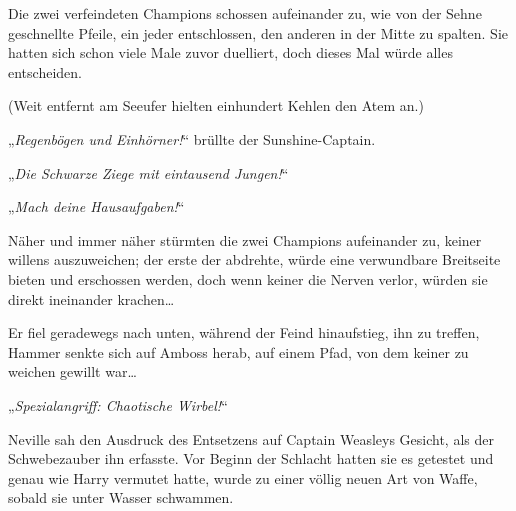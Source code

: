 Die zwei verfeindeten Champions schossen aufeinander zu, wie von der Sehne geschnellte Pfeile, ein jeder entschlossen, den anderen in der Mitte zu spalten. Sie hatten sich schon viele Male zuvor duelliert, doch dieses Mal würde alles entscheiden.

(Weit entfernt am Seeufer hielten einhundert Kehlen den Atem an.)

„\emph{Regenbögen und Einhörner!}“ brüllte der Sunshine-Captain.

„\emph{Die Schwarze Ziege mit eintausend Jungen!}“

„\emph{Mach deine Hausaufgaben!}“

Näher und immer näher stürmten die zwei Champions aufeinander zu, keiner willens auszuweichen; der erste der abdrehte, würde eine verwundbare Breitseite bieten und erschossen werden, doch wenn keiner die Nerven verlor, würden sie direkt ineinander krachen…

Er fiel geradewegs nach unten, während der Feind hinaufstieg, ihn zu treffen, Hammer senkte sich auf Amboss herab, auf einem Pfad, von dem keiner zu weichen gewillt war…

„\emph{Spezialangriff: Chaotische Wirbel!}“

Neville sah den Ausdruck des Entsetzens auf Captain Weasleys Gesicht, als der Schwebezauber ihn erfasste. Vor Beginn der Schlacht hatten sie es getestet und genau wie Harry vermutet hatte, wurde  zu einer völlig neuen Art von Waffe, sobald sie unter Wasser schwammen.

